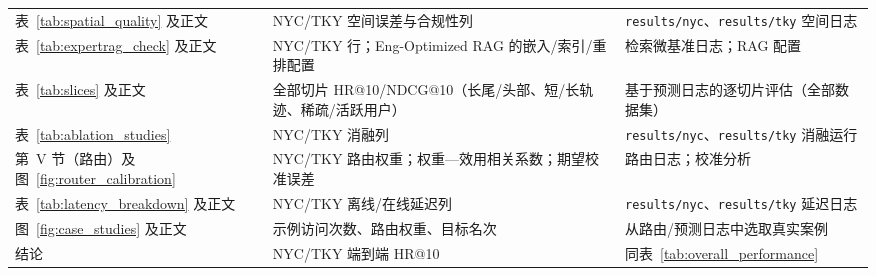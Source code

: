 \documentclass[10pt,fontset=none,twocolumn]{ctexart}
\begin{document}
\begin{table}[!t]
\begin{tabular}{p{}p{}p{}}
表~\ref{tab:spatial_quality} 及正文 & NYC/TKY 空间误差与合规性列 & \texttt{results/nyc}、\texttt{results/tky} 空间日志 \\
表~\ref{tab:expertrag_check} 及正文 & NYC/TKY 行；Eng-Optimized RAG 的嵌入/索引/重排配置 & 检索微基准日志；RAG 配置 \\
表~\ref{tab:slices} 及正文 & 全部切片 HR@10/NDCG@10（长尾/头部、短/长轨迹、稀疏/活跃用户） & 基于预测日志的逐切片评估（全部数据集） \\
表~\ref{tab:ablation_studies} & NYC/TKY 消融列 & \texttt{results/nyc}、\texttt{results/tky} 消融运行 \\
第~V 节（路由）及图~\ref{fig:router_calibration} & NYC/TKY 路由权重；权重—效用相关系数；期望校准误差 & 路由日志；校准分析 \\
表~\ref{tab:latency_breakdown} 及正文 & NYC/TKY 离线/在线延迟列 & \texttt{results/nyc}、\texttt{results/tky} 延迟日志 \\
图~\ref{fig:case_studies} 及正文 & 示例访问次数、路由权重、目标名次 & 从路由/预测日志中选取真实案例 \\
结论 & NYC/TKY 端到端 HR@10 & 同表~\ref{tab:overall_performance} \\ \bottomrule
\end{tabular}
\end{table}



\end{document}
